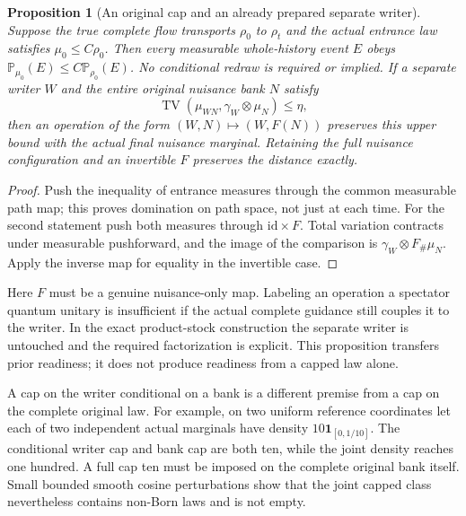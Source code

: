 \documentclass[11pt]{article}
\numberwithin{equation}{section}
\newtheorem{proposition}[theorem]{Proposition}
\theoremstyle{definition}
\theoremstyle{remark}
\newcommand{\TV}{\operatorname{TV}}
\begin{document}
\begin{proposition}[An original cap and an already prepared separate writer]
\label{p2s:prop:original}
Suppose the true complete flow transports $\rho_0$ to $\rho_t$ and the
actual entrance law satisfies $\mu_0\leq C\rho_0$. Then every measurable
whole-history event $E$ obeys $\mathbb P_{\mu_0}(E)\leq
C\mathbb P_{\rho_0}(E)$. No conditional redraw is required or implied.
If a separate writer $W$ and the entire original nuisance bank $N$ satisfy
\[
 \TV(\mu_{WN},\gamma_W\otimes\mu_N)\leq\eta,
\]
then an operation of the form $(W,N)\mapsto(W,F(N))$ preserves this upper
bound with the actual final nuisance marginal. Retaining the full nuisance
configuration and an invertible $F$ preserves the distance exactly.
\end{proposition}
\begin{proof}
Push the inequality of entrance measures through the common measurable
path map; this proves domination on path space, not just at each time.
For the second statement push both measures through $\mathrm{id}\times F$.
Total variation contracts under measurable pushforward, and the image of
the comparison is $\gamma_W\otimes F_\#\mu_N$. Apply the inverse map for
equality in the invertible case.
\end{proof}
Here $F$ must be a genuine nuisance-only map. Labeling an operation a
spectator quantum unitary is insufficient if the actual complete guidance
still couples it to the writer. In the exact product-stock construction the
separate writer is untouched and the required factorization is explicit.
This proposition transfers prior readiness; it does not produce readiness
from a capped law alone.

A cap on the writer conditional on a bank is a different premise from a
cap on the complete original law. For example, on two uniform reference
coordinates let each of two independent actual marginals have density
$10\mathbf1_{[0,1/10]}$. The conditional writer cap and bank cap are both
ten, while the joint density reaches one hundred. A full cap ten must be
imposed on the complete original bank itself. Small bounded smooth cosine
perturbations show that the joint capped class nevertheless contains
non-Born laws and is not empty.
\end{document}
